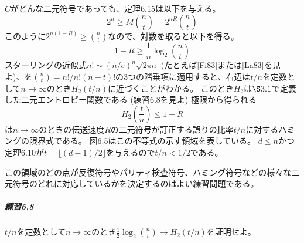 \documentclass[12pt,a4paper]{article}
\begin{document}
    $C$がどんな二元符号であっても、定理6.15は以下を与える。
    $$ 2^n \geq M \binom{n}{t} = 2^{nR} \binom{n}{t} $$
    このように$2^{n(1-R)} \geq \binom{n}{t}$なので、対数を取ると以下を得る。
    $$ 1 - R \geq \frac{1}{n} \log_2 \binom{n}{t} $$
    スターリングの近似式$n! \sim {(n/e)}^n \sqrt{2 \pi n}$ (たとえば[Fi83]または[La83]を見よ)、を$\binom{n}{t} = n! / n! (n - t)! $の3つの階乗項に適用すると、右辺は$t/n$を定数として$n \rightarrow \infty$のとき$H_2 (t/n)$に近づくことがわかる。
    このとき$H_2$は$\S 3.1$で定義した二元エントロピー関数である (練習6.8を見よ)
    極限から得られる
    $$ H_2(\frac{t}{n}) \leq 1 - R $$
    は$n \rightarrow \infty$のときの伝送速度$R$の二元符号が訂正する誤りの比率$t/n$に対するハミングの限界式である。
    図6.5はこの不等式の示す領域を表している。
    $d \leq n$かつ定理6.10が$t = \lfloor (d - 1) / 2 \rfloor $を与えるので$t/n < 1/2$である。

    この領域のどの点が反復符号やパリティ検査符号、ハミング符号などの様々な二元符号のどれに対応しているかを決定するのはよい練習問題である。

      \subparagraph{練習6.8}
        $t/n$を定数として$n \rightarrow \infty$のとき$\frac{1}{2} \log_2 \binom{n}{t} \rightarrow H_2(t/n)$を証明せよ。
\end{document}
